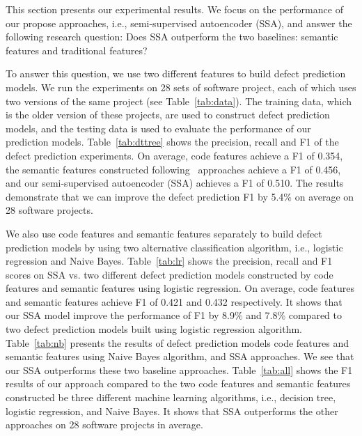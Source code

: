 This section presents our experimental results. We focus on the performance of our propose approaches, i.e., semi-supervised autoencoder (SSA), and answer the following research question: Does SSA outperform the two baselines: semantic features and traditional features? 

To answer this question, we use two different features to build defect prediction models. We run the experiments on 28 sets of software project, each of which uses two versions of the same project (see Table~\ref{tab:data}). The training data, which is the older version of these projects, are used to construct defect prediction models, and the testing data is used to evaluate the performance of our prediction models. Table~\ref{tab:dttree} shows the precision, recall and F1 of the defect prediction experiments. On average, code features achieve a F1 of 0.354, the semantic features constructed following~\cite{wang2016automatically} approaches achieve a F1 of 0.456, and our semi-supervised autoencoder (SSA) achieves a F1 of 0.510. The results demonstrate that we can improve the defect prediction F1 by 5.4\% on average on 28 software projects. 

We also use code features and semantic features separately to build defect prediction models by using two alternative classification algorithm, i.e., logistic regression and Naive Bayes. Table~\ref{tab:lr} shows the precision, recall and F1 scores on SSA vs. two different defect prediction models constructed by code features and semantic features using logistic regression. On average, code features and semantic features achieve F1 of 0.421 and 0.432 respectively. It shows that our SSA model improve the performance of F1 by 8.9\% and 7.8\% compared to two defect prediction models built using logistic regression algorithm. Table~\ref{tab:nb} presents the results of defect prediction models code features and semantic features using Naive Bayes algorithm, and SSA approaches. We see that our SSA outperforms these two baseline approaches. Table~\ref{tab:all} shows the F1 results of our approach compared to the two code features and semantic features constructed be three different machine learning algorithms, i.e., decision tree, logistic regression, and Naive Bayes. It shows that SSA outperforms the other approaches on 28 software projects in average. 


